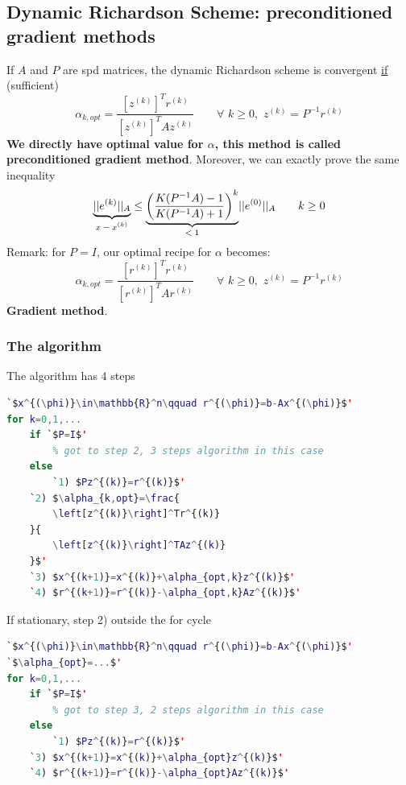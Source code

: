 \subsection{Dynamic Richardson Scheme: preconditioned gradient methods}
    If $A$ and $P$ are spd matrices, the dynamic Richardson scheme is convergent \underline{if} (sufficient)
    $$
    \alpha_{k,opt}=\frac{
        \left[z^{(k)}\right]^Tr^{(k)}
    }{
        \left[z^{(k)}\right]^TAz^{(k)}
    }\qquad\forall\,\,k\geq 0,\,\,z^{(k)}=P^{-1}r^{(k)}
    $$
    \textbf{We directly have optimal value for $\alpha$, this method is called preconditioned gradient method}. Moreover, we can exactly prove the same inequality
    $$
    \underlabel{||e^{(k)}||_A}{$x-x^{(k)}$}\leq
    \underlabel{
        \left(
            \frac{
                K(P^{-1}A)-1
            }{
                K(P^{-1}A)+1
            }
        \right)^k
    }{
        $<1$
    }||e^{(0)}||_A
    \qquad k\geq 0
    $$
    Remark: for $P=I$, our optimal recipe for $\alpha$ becomes:
    $$
    \alpha_{k,opt}=\frac{
        \left[r^{(k)}\right]^Tr^{(k)}
    }{
        \left[r^{(k)}\right]^TAr^{(k)}
    }\qquad\forall\,\,k\geq 0,\,\,z^{(k)}=P^{-1}r^{(k)}
    $$
    \textbf{Gradient method}.
    \subsubsection{The algorithm}
    The algorithm has 4 steps
    \begin{center}
        \begin{lstlisting}[language=Matlab, escapeinside=`']
% set intial guess, we can also define associated initial residual
`$x^{(\phi)}\in\mathbb{R}^n\qquad r^{(\phi)}=b-Ax^{(\phi)}$'
for k=0,1,...
    if `$P=I$'
        % got to step 2, 3 steps algorithm in this case
    else
        `1) $Pz^{(k)}=r^{(k)}$'
    `2) $\alpha_{k,opt}=\frac{
        \left[z^{(k)}\right]^Tr^{(k)}
    }{
        \left[z^{(k)}\right]^TAz^{(k)}
    }$'
    `3) $x^{(k+1)}=x^{(k)}+\alpha_{opt,k}z^{(k)}$'
    `4) $r^{(k+1)}=r^{(k)}-\alpha_{opt,k}Az^{(k)}$'
        \end{lstlisting}
    \end{center}
    If stationary, step 2) outside the for cycle
    \begin{center}
        \begin{lstlisting}[language=Matlab, escapeinside=`']
% set intial guess, we can also define associated initial residual
`$x^{(\phi)}\in\mathbb{R}^n\qquad r^{(\phi)}=b-Ax^{(\phi)}$'
`$\alpha_{opt}=...$'
for k=0,1,...
    if `$P=I$'
        % got to step 3, 2 steps algorithm in this case
    else
        `1) $Pz^{(k)}=r^{(k)}$'
    `3) $x^{(k+1)}=x^{(k)}+\alpha_{opt}z^{(k)}$'
    `4) $r^{(k+1)}=r^{(k)}-\alpha_{opt}Az^{(k)}$'
        \end{lstlisting}
    \end{center}
